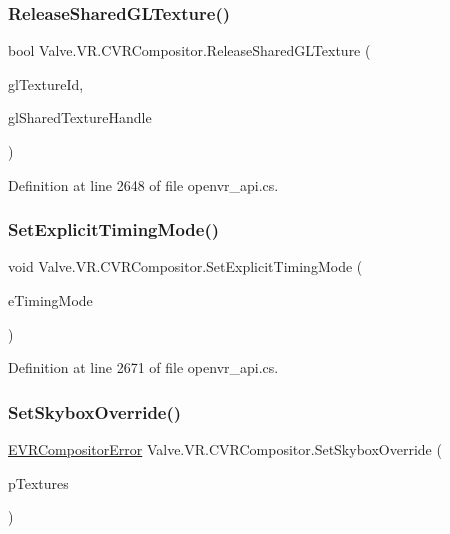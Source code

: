 \subsubsection{\texorpdfstring{ReleaseSharedGLTexture()}{ReleaseSharedGLTexture()}}
{\footnotesize\ttfamily bool Valve.\+V\+R.\+C\+V\+R\+Compositor.\+Release\+Shared\+G\+L\+Texture (\begin{DoxyParamCaption}\item[{uint}]{gl\+Texture\+Id,  }\item[{Int\+Ptr}]{gl\+Shared\+Texture\+Handle }\end{DoxyParamCaption})}



Definition at line 2648 of file openvr\+\_\+api.\+cs.

\mbox{\label{class_valve_1_1_v_r_1_1_c_v_r_compositor_a2c85589e4811758a11387e005218b55b}} 
\subsubsection{\texorpdfstring{SetExplicitTimingMode()}{SetExplicitTimingMode()}}
{\footnotesize\ttfamily void Valve.\+V\+R.\+C\+V\+R\+Compositor.\+Set\+Explicit\+Timing\+Mode (\begin{DoxyParamCaption}\item[{\mbox{\hyperlink{namespace_valve_1_1_v_r_a9fcb102e844540a2246475933f824463}{E\+V\+R\+Compositor\+Timing\+Mode}}}]{e\+Timing\+Mode }\end{DoxyParamCaption})}



Definition at line 2671 of file openvr\+\_\+api.\+cs.

\mbox{\label{class_valve_1_1_v_r_1_1_c_v_r_compositor_a45eec10604e2c3578b6fa7b16f05d072}} 
\subsubsection{\texorpdfstring{SetSkyboxOverride()}{SetSkyboxOverride()}}
{\footnotesize\ttfamily \mbox{\hyperlink{namespace_valve_1_1_v_r_ac34ee1034fda668ccd45f57676ded81b}{E\+V\+R\+Compositor\+Error}} Valve.\+V\+R.\+C\+V\+R\+Compositor.\+Set\+Skybox\+Override (\begin{DoxyParamCaption}\item[{\mbox{\hyperlink{struct_valve_1_1_v_r_1_1_texture__t}{Texture\+\_\+t}} \mbox{[}$\,$\mbox{]}}]{p\+Textures }\end{DoxyParamCaption})}



